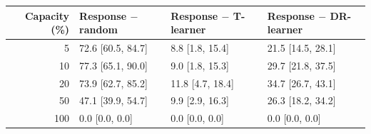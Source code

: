 \begin{tabular}{@{}rlll@{}}
\toprule
Capacity (\%) & Response $-$ random & Response $-$ T-learner & Response $-$ DR-learner \\
\midrule
5 & 72.6 [60.5, 84.7] & 8.8 [1.8, 15.4] & 21.5 [14.5, 28.1] \\
10 & 77.3 [65.1, 90.0] & 9.0 [1.8, 15.3] & 29.7 [21.8, 37.5] \\
20 & 73.9 [62.7, 85.2] & 11.8 [4.7, 18.4] & 34.7 [26.7, 43.1] \\
50 & 47.1 [39.9, 54.7] & 9.9 [2.9, 16.3] & 26.3 [18.2, 34.2] \\
100 & 0.0 [0.0, 0.0] & 0.0 [0.0, 0.0] & 0.0 [0.0, 0.0] \\
\bottomrule
\end{tabular}
